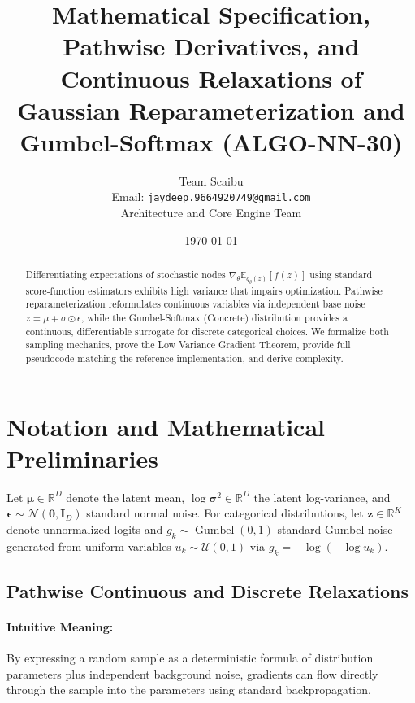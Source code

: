 \documentclass[11pt]{article}
\title{\textbf{Mathematical Specification, Pathwise Derivatives, and Continuous Relaxations of Gaussian Reparameterization and Gumbel-Softmax (ALGO-NN-30)}}
\author{Team Scaibu \\ \small Email: \texttt{jaydeep.9664920749@gmail.com} \\ \small Architecture and Core Engine Team}
\date{\today}
\begin{document}
\maketitle

\begin{abstract}
Differentiating expectations of stochastic nodes $\nabla_\theta \mathbb{E}_{q_\theta(z)}[f(z)]$ using standard score-function estimators exhibits high variance that impairs optimization. Pathwise reparameterization reformulates continuous variables via independent base noise $z = \mu + \sigma \odot \epsilon$, while the Gumbel-Softmax (Concrete) distribution provides a continuous, differentiable surrogate for discrete categorical choices. We formalize both sampling mechanics, prove the Low Variance Gradient Theorem, provide full pseudocode matching the reference implementation, and derive complexity.
\end{abstract}

\section{Notation and Mathematical Preliminaries}
\label{sec:notation}

Let $\boldsymbol{\mu} \in \mathbb{R}^D$ denote the latent mean, $\log\boldsymbol{\sigma}^2 \in \mathbb{R}^D$ the latent log-variance, and $\boldsymbol{\epsilon} \sim \mathcal{N}(\mathbf{0}, \mathbf{I}_D)$ standard normal noise. For categorical distributions, let $\mathbf{z} \in \mathbb{R}^K$ denote unnormalized logits and $g_k \sim \operatorname{Gumbel}(0, 1)$ standard Gumbel noise generated from uniform variables $u_k \sim \mathcal{U}(0, 1)$ via $g_k = -\log(-\log u_k)$.

\subsection{Pathwise Continuous and Discrete Relaxations}
\paragraph{Intuitive Meaning:} By expressing a random sample as a deterministic formula of distribution parameters plus independent background noise, gradients can flow directly through the sample into the parameters using standard backpropagation.
\end{document}
